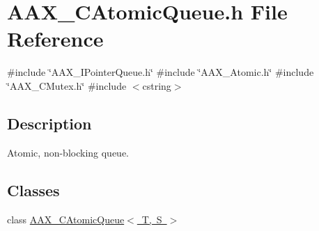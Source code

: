 \hypertarget{a00404}{}\section{A\+A\+X\+\_\+\+C\+Atomic\+Queue.\+h File Reference}
\label{a00404}
{\ttfamily \#include \char`\"{}A\+A\+X\+\_\+\+I\+Pointer\+Queue.\+h\char`\"{}}\newline
{\ttfamily \#include \char`\"{}A\+A\+X\+\_\+\+Atomic.\+h\char`\"{}}\newline
{\ttfamily \#include \char`\"{}A\+A\+X\+\_\+\+C\+Mutex.\+h\char`\"{}}\newline
{\ttfamily \#include $<$cstring$>$}\newline


\subsection{Description}
Atomic, non-\/blocking queue. 

\subsection*{Classes}
\begin{DoxyCompactItemize}
\item 
class \mbox{\hyperlink{a01441}{A\+A\+X\+\_\+\+C\+Atomic\+Queue$<$ T, S $>$}}
\end{DoxyCompactItemize}
